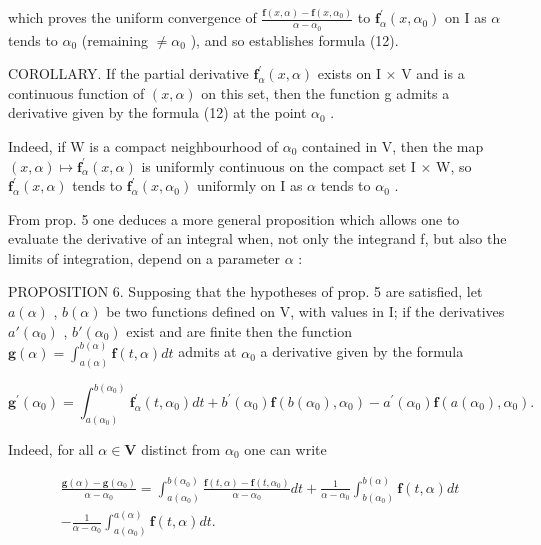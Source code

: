 which proves the uniform convergence of \(\frac{\mathbf{f}(x,\alpha)-\mathbf{f}(x,\alpha_{0})}{\alpha-\alpha_{0}}\) to \(\mathbf{f}_{\alpha}^{\prime}(x,\alpha_{0})\) on I as \(\alpha\) tends to \(\alpha_{0}\) (remaining \(\neq\alpha_{0}\) ), and so establishes formula (12).

COROLLARY. If the partial derivative \(\mathbf{f}_{\alpha}^{\prime}(x,\alpha)\) exists on I × V and is a continuous function of \((x,\alpha)\) on this set, then the function g admits a derivative given by the formula (12) at the point \(\alpha_{0}\) .

Indeed, if W is a compact neighbourhood of \(\alpha_{0}\) contained in V, then the map \((x,\alpha)\mapsto\mathbf{f}_{\alpha}^{\prime}(x,\alpha)\) is uniformly continuous on the compact set I × W, so \(\mathbf{f}_{\alpha}^{\prime}(x,\alpha)\) tends to \(\mathbf{f}_{\alpha}^{\prime}(x,\alpha_{0})\) uniformly on I as \(\alpha\) tends to \(\alpha_{0}\) .

From prop. 5 one deduces a more general proposition which allows one to evaluate the derivative of an integral when, not only the integrand f, but also the limits of integration, depend on a parameter \(\alpha\) :

PROPOSITION 6. Supposing that the hypotheses of prop. 5 are satisfied, let \(a(\alpha)\) , \(b(\alpha)\) be two functions defined on V, with values in I; if the derivatives \(a'(\alpha_0)\) , \(b'(\alpha_0)\) exist and are finite then the function \(\mathbf{g}(\alpha) = \int_{a(\alpha)}^{b(\alpha)} \mathbf{f}(t, \alpha) dt\) admits at \(\alpha_0\) a derivative given by the formula

\[
\mathbf {g} ^ {\prime} (\alpha_ {0}) = \int_ {a (\alpha_ {0})} ^ {b (\alpha_ {0})} \mathbf {f} _ {\alpha} ^ {\prime} (t, \alpha_ {0}) d t + b ^ {\prime} (\alpha_ {0}) \mathbf {f} (b (\alpha_ {0}), \alpha_ {0}) - a ^ {\prime} (\alpha_ {0}) \mathbf {f} (a (\alpha_ {0}), \alpha_ {0}).\tag{13}
\]

Indeed, for all \(\alpha \in \mathbf{V}\) distinct from \(\alpha_0\) one can write

\[
\begin{array}{c} \frac {\mathbf {g} (\alpha) - \mathbf {g} (\alpha_ {0})}{\alpha - \alpha_ {0}} = \int_ {a (\alpha_ {0})} ^ {b (\alpha_ {0})} \frac {\mathbf {f} (t , \alpha) - \mathbf {f} (t , \alpha_ {0})}{\alpha - \alpha_ {0}} d t + \frac {1}{\alpha - \alpha_ {0}} \int_ {b (\alpha_ {0})} ^ {b (\alpha)} \mathbf {f} (t, \alpha) d t \\ - \frac {1}{\alpha - \alpha_ {0}} \int_ {a (\alpha_ {0})} ^ {a (\alpha)} \mathbf {f} (t, \alpha) d t. \end{array}
\]

